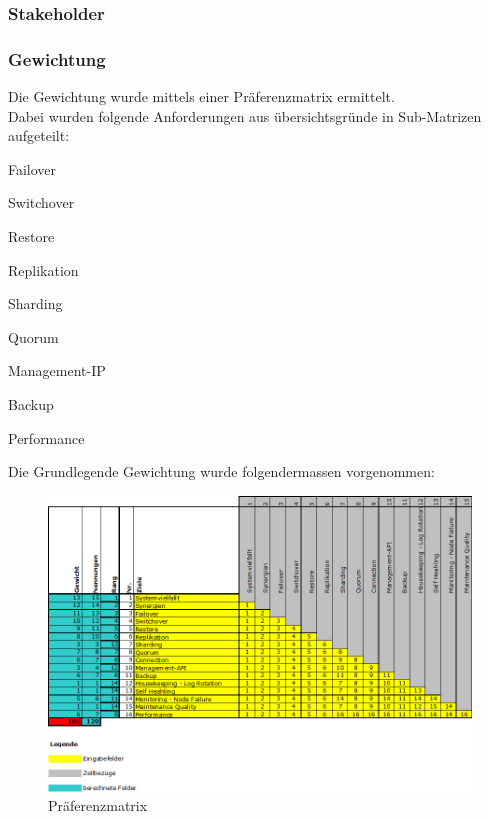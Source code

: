 \subsubsection{Stakeholder}
\begin{flushleft}
\end{flushleft}
\subsubsection{Gewichtung}
\begin{flushleft}
    Die Gewichtung wurde mittels einer Präferenzmatrix ermittelt.\\
    Dabei wurden folgende Anforderungen aus übersichtsgründe in Sub-Matrizen aufgeteilt:
    \begin{description}
        \item Failover
        \item Switchover
        \item Restore
        \item Replikation
        \item Sharding
        \item Quorum
        \item Management-IP
        \item Backup
        \item Performance
    \end{description}

    Die Grundlegende Gewichtung wurde folgendermassen vorgenommen:
    \begin{figure}[H]
        \centering
        \includegraphics[width=1\linewidth]{source/implementation/evaluation/requirements/preference_matrix}
        \caption{Präferenzmatrix}
        \label{fig:preference_matrix}
    \end{figure}
\end{flushleft}

